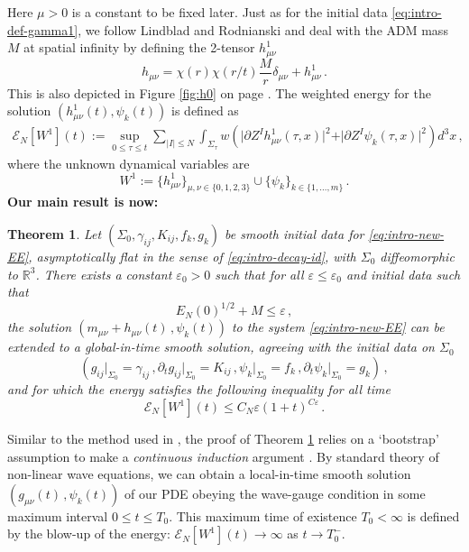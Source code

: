 \documentclass[11pt, a4paper]{amsart}
\numberwithin{equation}{section}
\newtheorem{theorem}{Theorem}
\numberwithin{theorem}{section}
\newcommand{\R}{\mathbb{R}}
\newcommand{\p}{\partial}
\newcommand{\mn}{{\mu \nu}}
\begin{document}
Here $\mu > 0$ is a constant to be fixed later. 
Just as for the initial data \eqref{eq:intro-def-gamma1}, we follow Lindblad and Rodnianski and deal with the ADM mass $M$ at spatial infinity by defining the 2-tensor $h^1_\mn$ 
$$ h_\mn = \chi(r)\chi(r/t) \frac{M}{r} \delta_\mn +  h^1_\mn \,.$$
This is also depicted in Figure \ref{fig:h0} on page \pageref{fig:h0}. The weighted energy for the solution $(h^1_\mn (t), \psi_k(t))$ is defined as
\begin{equation} \begin{split} \mathcal{E}_N[W^1] (t)
:= \sup_{0 \leq \tau \leq t}  \sum_{\vert I \vert \leq N}  \int_{\Sigma_\tau} w \left(  \vert \p Z^I h^1_\mn (\tau, x ) \vert^2 + \vert \p Z^I \psi_k (\tau, x ) \vert^2 \right) d^3 x \,, \label{eq:intro-energy-sol} \end{split}
\end{equation}
where the unknown dynamical variables are
$$W^1 := \{ h^1_\mn \}_{\mu, \nu \in \{ 0, 1, 2, 3 \}} \cup \{ \psi_k \}_{k \in \{1, \ldots, m \}} \,.$$ 
\textbf{Our main result is now:}
\begin{theorem} \label{theorem:intro1}
Let $( \Sigma_0,\gamma_{ij}, K_{ij}, f_k, g_k)$ be smooth initial data for \eqref{eq:intro-new-EE},  asymptotically flat in the sense of \eqref{eq:intro-decay-id}, with $\Sigma_0$ diffeomorphic to $\R^3$. 
There exists a constant $\varepsilon_0>0$ such that for all $\varepsilon \leq \varepsilon_0$ and initial data such that
$$E_N (0)^{1/2} + M \leq \varepsilon \,,$$
the solution $(m_\mn + h_\mn(t)\,, \psi_k(t))$ to the system \eqref{eq:intro-new-EE} can be extended to a global-in-time smooth solution, agreeing with the initial data on $\Sigma_0$
$$ (g_{ij} \vert_{\Sigma_0} = \gamma_{ij} \,, \p_t g_{ij} \vert_{\Sigma_0} = K_{ij} \,, \psi_k \vert_{\Sigma_0} = f_k \,, \p_t \psi_k \vert_{\Sigma_0} = g_k ) \,, $$
and for which the energy satisfies the following inequality for all time
\begin{equation} \mathcal{E}_N[W^1](t) \leq C_N \varepsilon (1+t)^{C\varepsilon} \,. \label{eq:intro-thm-aim} \end{equation}
\end{theorem}

Similar to the method used in \cite{LR:04}, the proof of Theorem \ref{theorem:intro1} relies on a `bootstrap' assumption to make a \textit{continuous induction} argument . 
By standard theory of non-linear wave equations, we can obtain a local-in-time smooth solution $(g_\mn(t)\,, \psi_k (t))$ of our PDE obeying the wave-gauge condition in some maximum interval $0 \leq t \leq T_0 $. This maximum time of existence $T_0< \infty$ is defined by the blow-up of the energy: $\mathcal{E}_N[W^1](t) \to \infty$ as $t \to T_0^-$. 
\end{document}
